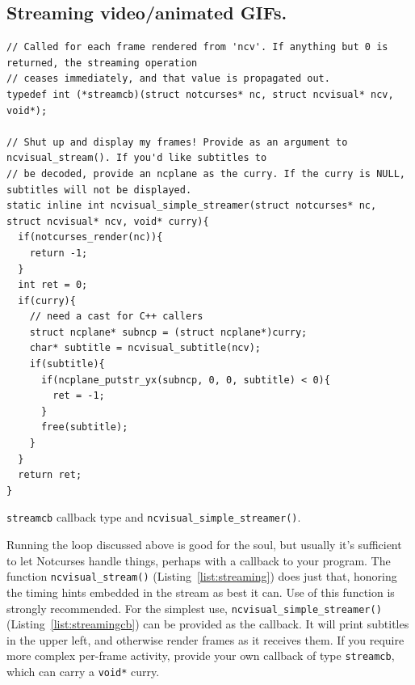 \documentclass[letterpaper,10pt]{article}
\begin{document}
\subsection{Streaming video/animated GIFs.}
\begin{listing}[!htb]
\begin{verbatim}
// Called for each frame rendered from 'ncv'. If anything but 0 is returned, the streaming operation
// ceases immediately, and that value is propagated out.
typedef int (*streamcb)(struct notcurses* nc, struct ncvisual* ncv, void*);

// Shut up and display my frames! Provide as an argument to ncvisual_stream(). If you'd like subtitles to
// be decoded, provide an ncplane as the curry. If the curry is NULL, subtitles will not be displayed.
static inline int ncvisual_simple_streamer(struct notcurses* nc, struct ncvisual* ncv, void* curry){
  if(notcurses_render(nc)){
    return -1;
  }
  int ret = 0;
  if(curry){
    // need a cast for C++ callers
    struct ncplane* subncp = (struct ncplane*)curry;
    char* subtitle = ncvisual_subtitle(ncv);
    if(subtitle){
      if(ncplane_putstr_yx(subncp, 0, 0, subtitle) < 0){
        ret = -1;
      }
      free(subtitle);
    }
  }
  return ret;
}
\end{verbatim}
\caption{\texttt{streamcb} callback type and \texttt{ncvisual\_simple\_streamer()}.}
\label{list:streamingcb}
\end{listing}

Running the loop discussed above is good for the soul, but usually it's
sufficient to let Notcurses handle things, perhaps with a callback to your
program. The function \texttt{ncvisual\_stream()} (Listing~\ref{list:streaming})
does just that, honoring the timing hints embedded in the stream as best it can.
Use of this function is strongly recommended. For the simplest use, \texttt{ncvisual\_simple\_streamer()}
(Listing~\ref{list:streamingcb}) can be provided as the callback. It will print
subtitles in the upper left, and otherwise render frames as it receives them.
If you require more complex per-frame activity, provide your own callback of
type \texttt{streamcb}, which can carry a \texttt{void*} curry.
\end{document}

